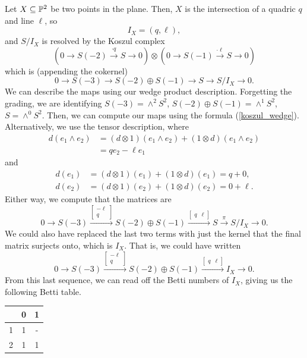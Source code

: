 \documentclass[12pt]{article}
\begin{document}
\begin{eg}
    Let $X\subseteq \P^2$ be two points in the plane. Then, $X$ is the intersection of a quadric $q$ and line $\ell$, so
    \[I_X = (q,\ell),\]
    and $S/I_X$ is resolved by the Koszul complex
    \[(0\to S(-2) \xrightarrow{\cdot q} S \to 0) \otimes (0 \to S(-1) \xrightarrow{\cdot \ell} S \to 0)\]
    which is (appending the cokernel)
    \[0\to S(-3) \to S(-2) \oplus S(-1) \to S \to S/I_X \to 0.\]
    We can describe the maps using our wedge product description. Forgetting the grading, we are identifying $S(-3)=\wedge^2 S^2$, $S(-2)\oplus S(-1)= \wedge^1 S^2$, $S=\wedge^0 S^2$. Then, we can compute our maps using the formula (\ref{koszul_wedge}). Alternatively, we use the tensor description, where
    \begin{align*}
        d(e_1\wedge e_2) &= (d\otimes 1)(e_1\wedge e_2) + (1\otimes d)(e_1\wedge e_2)\\
        &= q e_2 - \ell e_1
    \end{align*}
    and
    \begin{align*}
        d(e_1) &= (d\otimes 1)(e_1) + (1\otimes d)(e_1) = q + 0,\\
        d(e_2) &= (d\otimes 1)(e_2) + (1\otimes d)(e_2) = 0 + \ell.
    \end{align*}
    Either way, we compute that the matrices are
    \[0\to S(-3) \xrightarrow{\begin{bmatrix}
        -\ell\\
        q
    \end{bmatrix}} S(-2) \oplus S(-1) \xrightarrow{\begin{bmatrix}
        q & \ell
    \end{bmatrix}} S \xrightarrow{\pi} S/I_X \to 0.\]
    We could also have replaced the last two terms with just the kernel that the final matrix surjects onto, which is $I_X$. That is, we could have written
    \[0\to S(-3) \xrightarrow{\begin{bmatrix}
        -\ell\\
        q
    \end{bmatrix}} S(-2) \oplus S(-1) \xrightarrow{\begin{bmatrix}
        q & \ell
    \end{bmatrix}} I_X \to 0.\]
    From this last sequence, we can read off the Betti numbers of $I_X$, giving us the following Betti table.
    \begin{center}
        \begin{tabular}{c|c c}
              & 0 & 1 \\\hline
            1 & 1 & - \\
            2 & 1 & 1
        \end{tabular}
    \end{center}
\end{eg}
\end{document}
